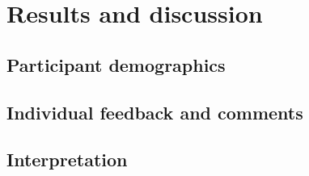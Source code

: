 \chapter{Results and discussion}
\label{sec:results_and_discussion}

	\section{Participant demographics}
	\label{sec:participant_demographics}

	\section{Individual feedback and comments}
	\label{sec:individual_feedback_and_comments}

	\section{Interpretation}
	\label{sec:interpretation}
